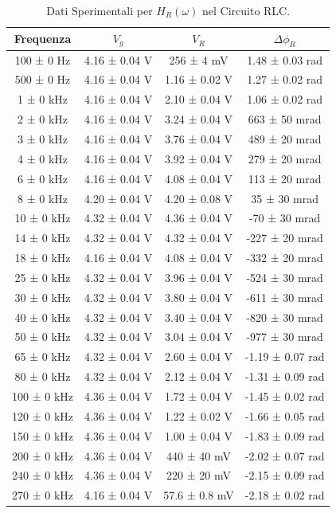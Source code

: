 \documentclass[a4paper]{article}
\begin{document}
\begin{table}[htbp]
\centering
\begin{tabular}{|c|c|c|c|}
\hline
Frequenza & $V_g$ & $V_R$ & $\Delta\phi_R$ \\\hline\hline
100 ± 0 Hz & 4.16 ± 0.04 V & 256 ± 4 mV & 1.48 ± 0.03 rad \\
500 ± 0 Hz & 4.16 ± 0.04 V & 1.16 ± 0.02 V & 1.27 ± 0.02 rad \\
1 ± 0 kHz & 4.16 ± 0.04 V & 2.10 ± 0.04 V & 1.06 ± 0.02 rad \\
2 ± 0 kHz & 4.16 ± 0.04 V & 3.24 ± 0.04 V & 663 ± 50 mrad \\
3 ± 0 kHz & 4.16 ± 0.04 V & 3.76 ± 0.04 V & 489 ± 20 mrad \\
4 ± 0 kHz & 4.16 ± 0.04 V & 3.92 ± 0.04 V & 279 ± 20 mrad \\
6 ± 0 kHz & 4.16 ± 0.04 V & 4.08 ± 0.04 V & 113 ± 20 mrad \\
8 ± 0 kHz & 4.20 ± 0.04 V & 4.20 ± 0.08 V & 35 ± 30 mrad \\
10 ± 0 kHz & 4.32 ± 0.04 V & 4.36 ± 0.04 V & -70 ± 30 mrad \\
14 ± 0 kHz & 4.32 ± 0.04 V & 4.32 ± 0.04 V & -227 ± 20 mrad \\
18 ± 0 kHz & 4.16 ± 0.04 V & 4.08 ± 0.04 V & -332 ± 20 mrad \\
25 ± 0 kHz & 4.32 ± 0.04 V & 3.96 ± 0.04 V & -524 ± 30 mrad \\
30 ± 0 kHz & 4.32 ± 0.04 V & 3.80 ± 0.04 V & -611 ± 30 mrad \\
40 ± 0 kHz & 4.32 ± 0.04 V & 3.40 ± 0.04 V & -820 ± 30 mrad \\
50 ± 0 kHz & 4.32 ± 0.04 V & 3.04 ± 0.04 V & -977 ± 30 mrad \\
65 ± 0 kHz & 4.32 ± 0.04 V & 2.60 ± 0.04 V & -1.19 ± 0.07 rad \\
80 ± 0 kHz & 4.32 ± 0.04 V & 2.12 ± 0.04 V & -1.31 ± 0.09 rad \\
100 ± 0 kHz & 4.36 ± 0.04 V & 1.72 ± 0.04 V & -1.45 ± 0.02 rad \\
120 ± 0 kHz & 4.36 ± 0.04 V & 1.22 ± 0.02 V & -1.66 ± 0.05 rad \\
150 ± 0 kHz & 4.36 ± 0.04 V & 1.00 ± 0.04 V & -1.83 ± 0.09 rad \\
200 ± 0 kHz & 4.36 ± 0.04 V & 440 ± 40 mV & -2.02 ± 0.07 rad \\
240 ± 0 kHz & 4.36 ± 0.04 V & 220 ± 20 mV & -2.15 ± 0.09 rad \\
270 ± 0 kHz & 4.16 ± 0.04 V & 57.6 ± 0.8 mV & -2.18 ± 0.02 rad \\
\hline
\end{tabular}
\caption{Dati Sperimentali per $H_R(\omega)$ nel Circuito RLC.}
\label{tab:dati_rlc_hr}
\end{table}
\end{document}
